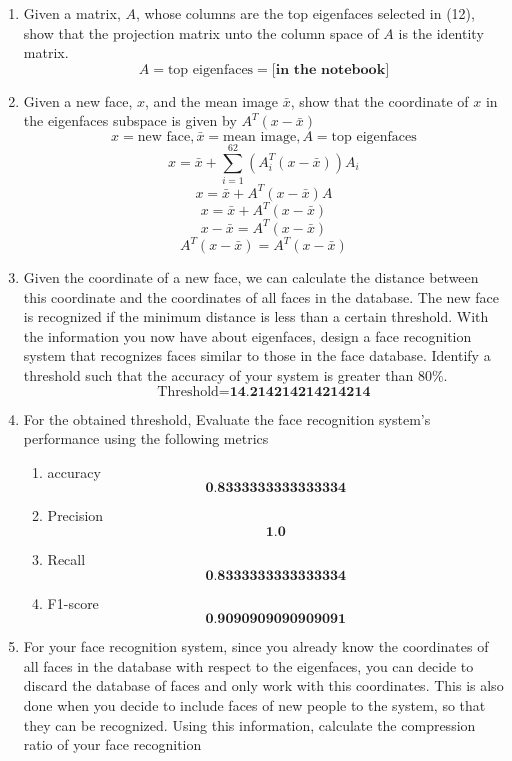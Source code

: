 \documentclass[12pt]{extarticle} %
\begin{document}
\begin{enumerate}
    \item  Given a matrix, \(A\), whose columns are the top eigenfaces selected in (12), show that the projection matrix unto the column space of \(A\) is the identity matrix.
    \[
    A = \text{top eigenfaces} = \textbf{[in the notebook]}
    \]
    \item Given a new face, \(x\), and the mean image \(\bar{x}\), show that the coordinate of \(x\) in the eigenfaces subspace is given by \(A^T(x-\bar{x})\)
    \[
    x = \text{new face}, \bar{x} = \text{mean image}, A = \text{top eigenfaces}
    \]
    \[
    x = \bar{x} + \sum_{i=1}^{62} (A_i^T(x-\bar{x}))A_i
    \]
    \[
    x = \bar{x} + A^T(x-\bar{x})A
    \]
    \[
    x = \bar{x} + A^T(x-\bar{x})
    \]
    \[
    x - \bar{x} = A^T(x-\bar{x})
    \]
    \[
    A^T(x-\bar{x}) = A^T(x-\bar{x})
    \]
    \item Given the coordinate of a new face, we can calculate the distance between this coordinate and the
    coordinates of all faces in the database. The new face is recognized if the minimum distance is less
    than a certain threshold. With the information you now have about eigenfaces, design a face
    recognition system that recognizes faces similar to those in the face database. Identify a
    threshold such that the accuracy of your system is greater than 80\%.
    \[
    \text{Threshold} = \textbf{14.214214214214214}
    \]
    \item For the obtained threshold, Evaluate the face recognition system’s performance using the following
    metrics
    \begin{enumerate}
        \item accuracy
        \[
            \textbf{0.8333333333333334}
        \]
        \item Precision
        \[
            \textbf{1.0}
        \]
        \item Recall
        \[
            \textbf{0.8333333333333334}
        \]
        \item F1-score
        \[
        \textbf{0.9090909090909091}
        \]
    \end{enumerate}
    \item For your face recognition system, since you already know the coordinates of all faces in the database
    with respect to the eigenfaces, you can decide to discard the database of faces and only work with this
    coordinates. This is also done when you decide to include faces of new people to the system, so that
    they can be recognized. Using this information, calculate the compression ratio of your face recognition

\end{enumerate}
\end{document}
